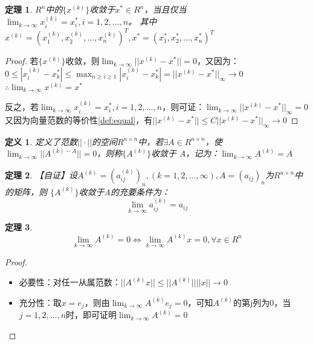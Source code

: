 \documentclass[a4paper]{article}
\newtheorem{definition}{定义}[section]
\newtheorem{theorem}{定理}[section]
\begin{document}
\begin{theorem}
  $R^n$中的$\{x^{(k)}\}$收敛于$x^*\in R^n$，当且仅当$\lim_{k\rightarrow \infty}x_i^{(k)}=x_i^*, i=1,2,\dots, n $。
  其中$x^{(k)}=(x_1^{(k)}, x_2^{(k)}, \dots, x_n^{(k)})^T, x^*=(x_1^*, x_2^*, \dots, x_n^*)^T $
\end{theorem}

\begin{proof}
  若$\{x^{(k)}\}$收敛，则$\lim_{k\rightarrow \infty}||x^{(k)}-x^*|| = 0 $，又因为：$0\le |x_i^{(k)}-x_k^*|\le \max_{n\ge i\ge 1}|x_i^{(k)}-x_k^*|=||x^{(k)}-x^*||_\infty \rightarrow 0 $\\
  $\therefore \lim_{k\rightarrow \infty}x^{(k)} = x^*$

  反之，若$\lim_{k\rightarrow \infty}x_i^{(k)}=x_i^*, i=1,2,\dots, n $，则可证：$\lim_{k\rightarrow \infty}||x^{(k)}-x^*||_\infty = 0$
  又因为向量范数的等价性\ref{def:equal}，有$||x^{(k)}-x^*||\le C||x^{(k)}-x^*||_\infty \rightarrow 0$
\end{proof}

\begin{definition}
  定义了范数$||\cdot||$的空间$R^{n\times n} $中，若$\exists A \in R^{n\times n}$，使$\lim_{k\rightarrow \infty}||A^{(k)-A}||=0$，则称$\{A^{(k)}\}$收敛于
  A，记为：$\lim_{k\rightarrow \infty} A^{(k)}=A$
\end{definition}

\begin{theorem}
  【自证】设$A^{(k)}=(a_{ij}^{(k)})_n, (k=1,2,\dots, \infty), A=(a_{ij})_n$为$R^{n\times n}$中的矩阵，则
  $\{A^{(k)}\}$收敛于A的充要条件为：
  $$\lim_{k\rightarrow \infty}a_{ij}^{(k)}=a_{ij}$$
\end{theorem}

\begin{theorem}
  $$\lim_{k\rightarrow \infty} A^{(k)}=0 \Leftrightarrow \lim_{k\rightarrow \infty} A^{(k)}x=0, \forall x \in R^n$$
  \label{theorem:6.3}
\end{theorem}
\begin{proof}
  \begin{itemize}
    \item 必要性：对任一从属范数：$||A^{(k)}x||\le ||A^{(k)}||||x|| \rightarrow 0$
    \item 充分性：取$x=e_j$，则由$\lim_{k\rightarrow \infty}A^{(k)}e_j = 0$，可知$A^{(k)}$的第j列为0，当$j=1,2,\dots, n$时，即可证明$\lim_{k\rightarrow \infty}A^{(k)}=0$
  \end{itemize}
\end{proof}
\end{document}
